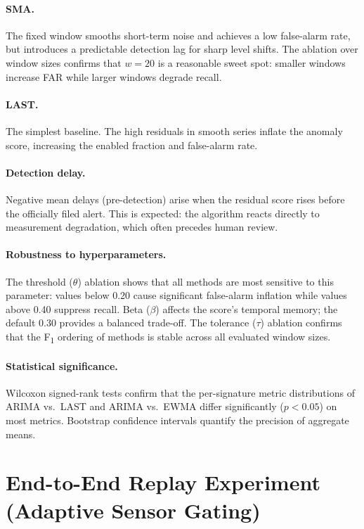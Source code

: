 \documentclass[11pt,a4paper]{article}
\begin{document}
\paragraph{SMA.}
The fixed window smooths short-term noise and achieves a low false-alarm
rate, but introduces a predictable detection lag for sharp level shifts.
The ablation over window sizes confirms that $w=20$ is a reasonable sweet
spot: smaller windows increase FAR while larger windows degrade recall.

\paragraph{LAST.}
The simplest baseline.  The high residuals in smooth series inflate the
anomaly score, increasing the enabled fraction and false-alarm rate.

\paragraph{Detection delay.}
Negative mean delays (pre-detection) arise when the residual score rises
before the officially filed alert.  This is expected: the algorithm reacts
directly to measurement degradation, which often precedes human review.

\paragraph{Robustness to hyperparameters.}
The threshold ($\theta$) ablation shows that all methods are most
sensitive to this parameter: values below 0.20 cause significant
false-alarm inflation while values above 0.40 suppress recall.
Beta ($\beta$) affects the score's temporal memory; the default 0.30
provides a balanced trade-off.  The tolerance ($\tau$) ablation confirms
that the F\textsubscript{1} ordering of methods is stable across all
evaluated window sizes.

\paragraph{Statistical significance.}
Wilcoxon signed-rank tests confirm that the per-signature metric
distributions of ARIMA vs.\ LAST and ARIMA vs.\ EWMA differ
significantly ($p < 0.05$) on most metrics.  Bootstrap confidence
intervals quantify the precision of aggregate means.


\section{End-to-End Replay Experiment (Adaptive Sensor Gating)}
\end{document}
